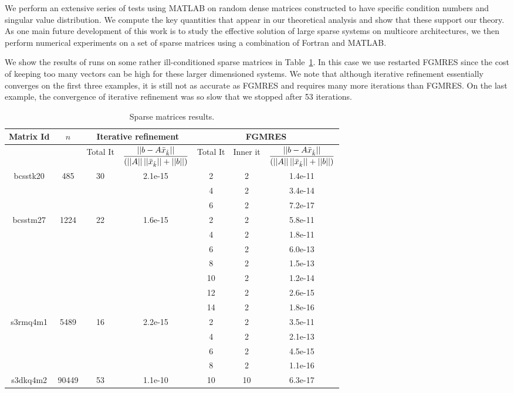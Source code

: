 \documentclass{report}
\begin{document}
We perform an extensive series of tests using MATLAB on random dense matrices
constructed to have specific condition numbers and singular value
distribution. We compute the key quantities that appear in our theoretical
analysis and show that these support our theory. As one main future
development of this
work is to study the effective solution of large sparse systems on
multicore architectures, we then perform numerical experiments on a set of
sparse matrices using a combination of Fortran and MATLAB.

We show the results of runs on some rather ill-conditioned sparse matrices in
Table~\ref{tab:7}. In this case we use restarted FGMRES since the cost of
keeping
too many vectors can be high for these larger dimensioned systems. We
note that although iterative refinement essentially converges on the first
three examples, it is still not as accurate as FGMRES and requires many more
iterations than FGMRES.
On the last example, the convergence of iterative refinement was so slow that
we stopped after 53 iterations.
\begin{table} [hbt] \small
\begin{center}
\begin{tabular}{|c|c|c|c|c|c|c|}
\hline
Matrix Id& $n$ & \multicolumn{2}{|c|}{Iterative
refinement}&\multicolumn{3}{|c|}{FGMRES} \\ \hline
& &Total It & ${\displaystyle \frac{|| b -A \bar{x}_{\hat{k}}||}{(||A|| \,
||\bar{x}_{\hat{k}}|| + ||b||)}}$ &Total It &Inner it & ${\displaystyle
\frac{|| b -A \bar{x}_{\hat{k}}||}{(||A|| \, ||\bar{x}_{\hat{k}}|| + ||b||)}}$ \\
\hline
bcsstk20 & 485 &30& 2.1e-15 & 2 & 2 & 1.4e-11 \\
& & & & 4 & 2 & 3.4e-14 \\
& & & & 6 & 2 & 7.2e-17 \\ \hline
bcsstm27& 1224 &22&1.6e-15 & 2 & 2 & 5.8e-11 \\
& & & & 4 & 2 & 1.8e-11 \\
& & & & 6 & 2 & 6.0e-13 \\
& & & & 8 & 2 &1.5e-13 \\
& & & &10&2 &1.2e-14 \\
& & & &12&2 &2.6e-15 \\
& & & &14&2 &1.8e-16 \\ \hline
s3rmq4m1& 5489 &16& 2.2e-15 & 2&2 &3.5e-11 \\
& & & & 4 &2 & 2.1e-13 \\
& & & & 6 &2 &4.5e-15 \\
& & & & 8 &2 &1.1e-16 \\ \hline
s3dkq4m2& 90449&53&1.1e-10 &10 & 10& 6.3e-17 \\ \hline
\end{tabular}
\end{center}
\vspace{5mm}
\caption{Sparse matrices results.}
\label{tab:7}
\end{table}
\end{document}
